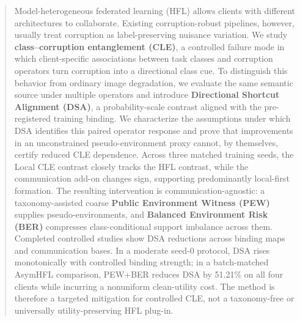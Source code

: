 \begin{abstract}

Model-heterogeneous federated learning (HFL) allows clients with different architectures to collaborate. Existing corruption-robust pipelines, however, usually treat corruption as label-preserving nuisance variation. We study \textbf{class--corruption entanglement (CLE)}, a controlled failure mode in which client-specific associations between task classes and corruption operators turn corruption into a directional class cue. To distinguish this behavior from ordinary image degradation, we evaluate the same semantic source under multiple operators and introduce \textbf{Directional Shortcut Alignment (DSA)}, a probability-scale contrast aligned with the pre-registered training binding. We characterize the assumptions under which DSA identifies this paired operator response and prove that improvements in an unconstrained pseudo-environment proxy cannot, by themselves, certify reduced CLE dependence. Across three matched training seeds, the Local CLE contrast closely tracks the HFL contrast, while the communication add-on changes sign, supporting predominantly local-first formation. The resulting intervention is communication-agnostic: a taxonomy-assisted coarse \textbf{Public Environment Witness (PEW)} supplies pseudo-environments, and \textbf{Balanced Environment Risk (BER)} compresses class-conditional support imbalance across them. Completed controlled studies show DSA reductions across binding maps and communication bases. In a moderate seed-0 protocol, DSA rises monotonically with controlled binding strength; in a batch-matched AsymHFL comparison, PEW+BER reduces DSA by 51.21\% on all four clients while incurring a nonuniform clean-utility cost. The method is therefore a targeted mitigation for controlled CLE, not a taxonomy-free or universally utility-preserving HFL plug-in.
\ifdraftskeleton
{}
\fi

\end{abstract}
